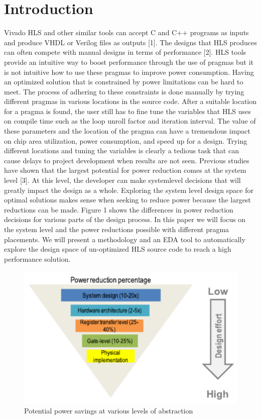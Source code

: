 \documentclass[letterpaper, 10 pt, conference]{IEEEconf}  %
\begin{document}
\section{Introduction}
Vivado HLS and other similar tools can accept C and C++ programs as inputs and produce VHDL or Verilog files as outputs [1].  The designs that HLS produces can often compete with manual designs in terms of performance [2]. HLS tools provide an intuitive way to boost performance through the use of pragmas but it is not intuitive how to use these pragmas to improve power consumption. Having an optimized solution that is constrained by power limitations can be hard to meet. The process of adhering to these constraints is done manually by trying different pragmas in various locations in the source code. After a suitable location for a pragma is found, the user still has to fine tune the variables that HLS uses on compile time such as the loop unroll factor and iteration interval. The value of these parameters and the location of the pragma can have a tremendous impact on chip area utilization, power consumption, and speed up for a design. Trying different locations and tuning the variables is clearly a tedious task that can cause delays to project development when results are not seen.  \newline
\indent Previous studies have shown that the largest potential for power reduction comes at the system level [3]. At this level, the developer can make system\-level decisions that will greatly impact the design as a whole. Exploring the system level design space for optimal solutions makes sense when seeking to reduce power because the largest reductions can be made. Figure 1 shows the differences in power reduction decisions for various parts of the design process. In this paper we will focus on the system level and the power reductions possible with different pragma placements. We will present a methodology and an EDA tool to automatically explore the design space of un-optimized HLS source code to reach a high performance solution. 

\begin{figure}[H]
\centering
\includegraphics[scale=.4]{Picture1.png} 
\caption{Potential power savings at various levels of abstraction}
\end{figure}
\end{document}
